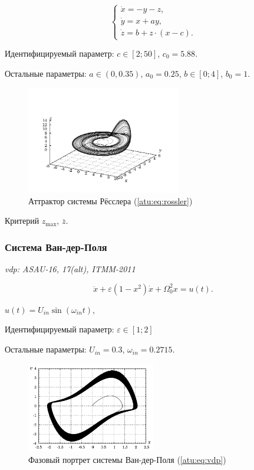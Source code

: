 \documentclass[a4paper,12pt]{article}
\newcommand{\LinkRef}[1]{ \textit{#1} }
\begin{document}
\begin{equation}
\begin{cases}
  \dot{x}  = -y - z  ,  \\
  \dot{y}  = x + a y ,\\
  \dot{z}  = b + z \cdot ( x-c ) .
\end{cases}
\label{atu:eq:rossler}
\end{equation}

Идентифицируемый параметр:
$ c \in [2; 50] $, $c_0=5.88$.

Остальные параметры:
\( a \in (0, 0.35 ) \), $a_0=0.25$,
\(b \in[0;4] \), $b_0=1$.

\begin{figure}[htb!]
\centerline{\includegraphics[width=0.6\textwidth]{p/cha/ross_phase3.pdf} }
\caption{Аттрактор системы Рёсслера (\ref{atu:eq:rossler})}
\label{atu:f:ross_phase}
\end{figure}

Критерий
$ z_{\max}$, $ \overline{z} $.



\FloatBarrier
\subsubsection{Система Ван-дер-Поля} %

\LinkRef{
  vdp: ASAU-16, 17(alt), ITMM-2011
}

\begin{equation}
 \ddot{x} + \varepsilon (1-x^2)  \dot{x} + \Omega_0^2 x  = u(t) .
\label{atu:eq:vdp}
\end{equation}

\( u(t) = U_{in} \sin ( \omega_{in} t ) \),

Идентифицируемый параметр:
\( \varepsilon \in [1;2]  \)

Остальные параметры:
\(U_{in}=0.3\),
\(\omega_{in}=0.2715\).


\begin{figure}[htb!]
\centerline{\includegraphics[width=0.5\textwidth]{p/cha/vdp_phase.pdf} }
\caption{Фазовый портрет системы Ван-дер-Поля (\ref{atu:eq:vdp})}
\label{atu:f:vdp_phase}
\end{figure}
\end{document}
